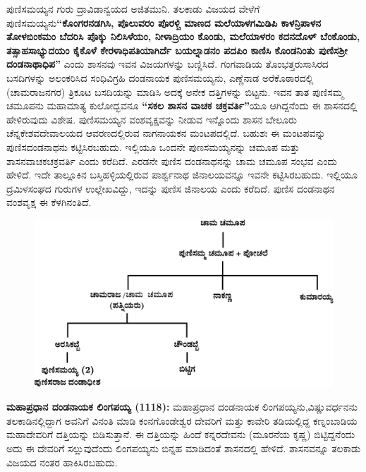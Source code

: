 ಪುಣಿಸಮಯ್ಯನ ಗುರು ದ್ರಾವಿಡಾನ್ವಯದ ಅಜಿತಮುನಿ. ತಲಕಾಡು ವಿಜಯದ ವೇಳೆಗೆ ಪುಣಿಸಮಯ್ಯನು\break \textbf{“ಕೊಂಗರನಡಗಿಸಿ, ಪೊಲುವರಂ ಪೊರಳ್ಚಿ ಮಾಣದ ಮಲೆಯಾಳಗಮಿಡಿಪಿ ಕಾಳನ್ರಿಪಾಳನ ತೋಳಬಿಂಕಮಂ ಬೆದರಿಸಿ ಪೊಕ್ಕು ನಿಲಿಸಿಳೆಯಂ, ನೀಳಾದ್ರಿಯಂ ಕೊಂಡು, ಮಲೆಯಾಳರಂ ಕದನದೊಳ್​ ಬೆಂಕೊಂಡು, ತತ್ಸಾಹಸಾಭ್ಯುದಯಂ ಕೈಕೊಳೆ\general{\break } ಕೇರಳಾಧಿಪತಿಯಾಗಿರ್ದೆ ಬಯಲ್ನಾಡನಂ ಪದಪಿಂ ಕಾಣಿಸಿ ಕೊಂಡನಿಂತು ಪುಣಿಸಶ‍್ರೀ ದಂಡನಾಥಾಧಿಪ”} ಎಂದು ಶಾಸನವು ಇವನ ವಿಜಯಗಳನ್ನು ಬಣ್ಣಿಸಿದೆ. ಗಂಗವಾಡಿಯ ತೊಂಭತ್ತರುಸಾಸಿರದ ಬಸದಿಗಳನ್ನು ಅಲಂಕರಿಸಿದ ಸಂಧಿವಿಗ್ರಹಿ ದಂಡನಾಯಕ ಪುಣಿಸಮಯ್ಯನು, ಎಣ್ಣೆನಾಡ ಅರೆಕೊಠಾರದಲ್ಲಿ (ಚಾಮರಾಜನಗರ) ತ್ರಿಕೂಟ ಬಸದಿಯನ್ನು ಮಾಡಿಸಿ ಅದಕ್ಕೆ ಅನೇಕ ದತ್ತಿಗಳನ್ನು ಬಿಟ್ಟನು. ಇವನ ತಾತ ಪುಣಿಸಮ್ಮ ಚಮೂಪನು ಮಹಾಮಾತ್ಯ ಕುಲೋದ್ಭವನೂ \textbf{“ಸಕಲ ಶಾಸನ ವಾಚಕ ಚಕ್ರವರ್ತಿ”}ಯೂ ಆಗಿದ್ದನೆಂದು ಈ ಶಾಸನದಲ್ಲಿ ಹೇಳಿರುವುದು ವಿಶೇಷ. ಪುಣಿಸಮಯ್ಯನ ವಂಶವೃಕ್ಷವನ್ನು ನೀಡುವ ಇನ್ನೊಂದು ಶಾಸನ ಬೇಲೂರು ಚೆನ್ನಕೇಶವದೇವಾಲಯದ ಆವರಣದಲ್ಲಿರುವ ನಾಗನಾಯಕನ ಮಂಟಪದಲ್ಲಿದೆ. ಬಹುಶಃ ಈ ಮಂಟಪವನ್ನು ಪುಣಿಸದಂಡನಾಥನು ಕಟ್ಟಿಸಿರಬಹುದು. ಇಲ್ಲಿಯೂ ಒಂದನೇ ಪುಣಸಮಯ್ಯನನ್ನು ಚಮೂಪ ಮತ್ತು ಶಾಸನವಾಚಕಚಕ್ರವರ್ತಿ ಎಂದು ಕರೆದಿದೆ. ಎರಡನೇ ಪುಣಿಸ ದಂಡನಾಥನನ್ನು ಚಾಮ ಚಮೂಪ ಸಂಭವ ಎಂದು ಹೇಳಿದೆ. ಇದೇ ತಾಲ್ಲೂಕಿನ ಬಸ್ತಿಹಳ್ಳಿಯಲ್ಲಿರುವ ಪಾರ್ಶ್ವನಾಥ ಜಿನಾಲಯವನ್ನೂ ಇವನೇ ಕಟ್ಟಿಸಿರಬಹುದು. ಇಲ್ಲಿಯೂ ದ್ರಮಿಳಸಂಘದ ಗುರುಗಳ ಉಲ್ಲೇಖವಿದ್ದು, ಇದನ್ನು ಪುಣಿಸ ಜಿನಾಲಯ ಎಂದು ಕರೆದಿದೆ. ಪುಣಿಸ ದಂಡನಾಥನ ವಂಶವೃಕ್ಷ ಈ ಕೆಳಗಿನಂತಿದೆ.

\begin{figure}[H]
\includegraphics[scale=1.15]{images/chap3/chap3fig16.jpeg}
\end{figure}

\textbf{ಮಹಾಪ್ರಧಾನ ದಂಡನಾಯಕ ಲಿಂಗಪಯ್ಯ (1118):} ಮಹಾಪ್ರಧಾನ ದಂಡನಾಯಕ ಲಿಂಗಪಯ್ಯನು,\break ವಿಷ್ಣುವರ್ಧನನು ತಲಕಾಡಿನಲ್ಲಿದ್ದಾಗ ಅವನಿಗೆ ವಿನಂತಿ ಮಾಡಿ ಕಂನಗೊಂಡೇಶ್ವರ ದೇವರಿಗೆ ಮತ್ತು ಕಾವೇರಿ ತಡಿಯಲ್ಲಿದ್ದ ಕಣ್ನಂಬಾಡಿಯ ಮಹಾದೇವರಿಗೆ ದತ್ತಿಯನ್ನು ಬಿಡಿಸುತ್ತಾನೆ. ಈ ದತ್ತಿಯನ್ನು ಹಿಂದೆ ಕನ್ನರದೇವನು (ಮೂರನೆಯ ಕೃಷ್ಣ) ಬಿಟ್ಟಿದ್ದನೆಂದು ಅದು ಈ ದೇವರಿಗೆ ಸಲ್ಲುವುದೆಂದು ಲಿಂಗಪಯ್ಯನು ಬಿನ್ನಹ ಮಾಡಿದಂತೆ ಶಾಸನದಲ್ಲಿ ಹೇಳಿದೆ. ಶಾಸನವನ್ನೂ ತಲಕಾಡು ವಿಜಯದ ನಂತರ ಹಾಕಿಸಿರಬಹುದು.


